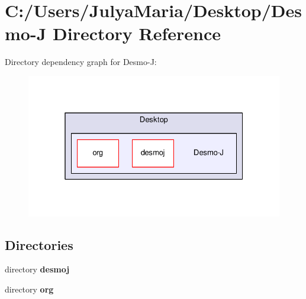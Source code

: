 \section{C\-:/\-Users/\-Julya\-Maria/\-Desktop/\-Desmo-\/\-J Directory Reference}
\label{dir_26d75ade307c77ed08b7bb07de91e2fa}
Directory dependency graph for Desmo-\/\-J\-:
\nopagebreak
\begin{figure}[H]
\begin{center}
\leavevmode
\includegraphics[width=328pt]{dir_26d75ade307c77ed08b7bb07de91e2fa_dep}
\end{center}
\end{figure}
\subsection*{Directories}
\begin{DoxyCompactItemize}
\item 
directory {\bf desmoj}
\item 
directory {\bf org}
\end{DoxyCompactItemize}
